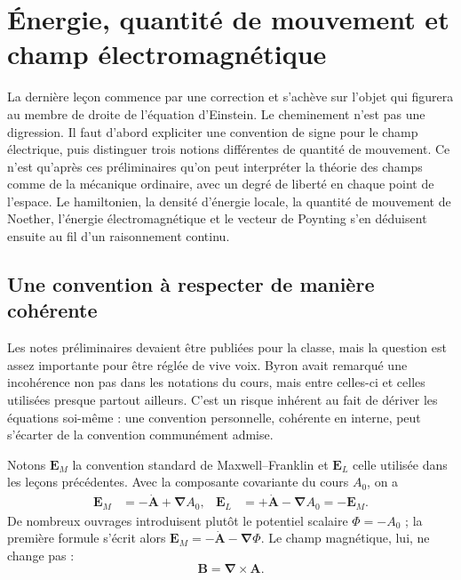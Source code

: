 \chapter{Énergie, quantité de mouvement et champ électromagnétique}

La dernière leçon commence par une correction et s’achève sur l’objet qui figurera au membre de droite de l’équation d’Einstein. Le cheminement n’est pas une digression. Il faut d’abord expliciter une convention de signe pour le champ électrique, puis distinguer trois notions différentes de quantité de mouvement. Ce n’est qu’après ces préliminaires qu’on peut interpréter la théorie des champs comme de la mécanique ordinaire, avec un degré de liberté en chaque point de l’espace. Le hamiltonien, la densité d’énergie locale, la quantité de mouvement de Noether, l’énergie électromagnétique et le vecteur de Poynting s’en déduisent ensuite au fil d’un raisonnement continu.

\section{Une convention à respecter de manière cohérente}

Les notes préliminaires devaient être publiées pour la classe, mais la question est assez importante pour être réglée de vive voix. Byron avait remarqué une incohérence non pas dans les notations du cours, mais entre celles-ci et celles utilisées presque partout ailleurs. C’est un risque inhérent au fait de dériver les équations soi-même : une convention personnelle, cohérente en interne, peut s’écarter de la convention communément admise.

Notons \(\mathbf E_M\) la convention standard de Maxwell--Franklin et \(\mathbf E_L\) celle utilisée dans les leçons précédentes. Avec la composante covariante du cours \(A_0\), on a \begin{align}
\mathbf E_M
  &= -\dot{\mathbf A}+\boldsymbol{\nabla}A_0,
&
\mathbf E_L
  &= +\dot{\mathbf A}-\boldsymbol{\nabla}A_0
   =-\mathbf E_M .
\label{eq:two-electric-conventions}
\end{align} De nombreux ouvrages introduisent plutôt le potentiel scalaire \(\Phi=-A_0\) ; la première formule s’écrit alors \(\mathbf E_M=-\dot{\mathbf A}-\boldsymbol{\nabla}\Phi\). Le champ magnétique, lui, ne change pas : \begin{equation}
\mathbf B=\boldsymbol{\nabla}\times\mathbf A.
\label{eq:B-from-A-opening}
\end{equation}

